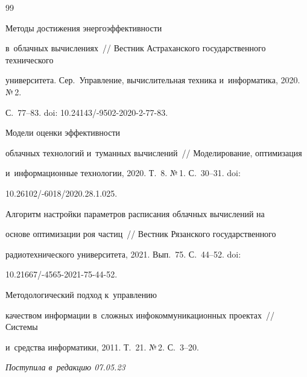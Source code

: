{{\begin{thebibliography}{99}

 Методы достижения энер\-го\-эф\-фек\-тив\-ности 

в~об\-лач\-ных вы\-чис\-ле\-ни\-ях~/\!\!/ Вест\-ник Астраханского государственного технического 

университета. Сер.\ Управ\-ле\-ние, вы\-чис\-ли\-тель\-ная техника и~информатика, 2020. №\,2.  

С.~77--83. doi: 10.24143\!/-9502-2020-2-77-83.


 Модели оценки эф\-фек\-тив\-ности 

об\-лач\-ных технологий и~туманных вы\-чис\-ле\-ний~/\!\!/ Моделирование, оптимизация 

и~информационные технологии, 2020. Т.~8. №\,1. С.~30--31. doi:  

10.26102\!/-6018/2020.28.1.025.


 Алгоритм настройки параметров расписания облачных вычислений на 

основе оптимизации роя частиц~/\!\!/ Вестник Рязанского государственного 

радиотехнического университета, 2021. Вып.~75. С.~44--52. doi:  

10.21667\!/-4565-2021-75-44-52.


 Методологический подход к~управ\-ле\-нию 

качеством информации в~слож\-ных инфокоммуникационных проектах~/\!\!/ Сис\-те\-мы 

и~средства информатики, 2011. Т.~21. №\,2. С.~3--20.

   \end{thebibliography}

} }







\vspace*{-6pt}



\hfill{\small\textit{Поступила в~редакцию 07.05.23}}






